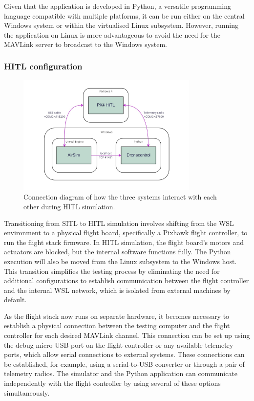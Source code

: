 Given that the application is developed in Python, a versatile programming language compatible with multiple platforms, it can be run either on the central Windows system or within the virtualised Linux subsystem. However, running the application on Linux is more advantageous to avoid the need for the MAVLink server to broadcast to the Windows system.



\subsubsection{HITL configuration}

\begin{figure}
  \centering
  \includegraphics[width=0.8\textwidth,keepaspectratio]{img/hitl-connections.jpg}
  \caption{Connection diagram of how the three systems interact with each other during HITL simulation.}\label{fig:hitl-connections}
\end{figure}

Transitioning from SITL to HITL simulation involves shifting from the WSL environment to a physical flight board, specifically a Pixhawk flight controller, to run the flight stack firmware. In HITL simulation, the flight board's motors and actuators are blocked, but the internal software functions fully. The Python execution will also be moved from the Linux subsystem to the Windows host. This transition simplifies the testing process by eliminating the need for additional configurations to establish communication between the flight controller and the internal WSL network, which is isolated from external machines by default.

As the flight stack now runs on separate hardware, it becomes necessary to establish a physical connection between the testing computer and the flight controller for each desired MAVLink channel. This connection can be set up using the debug micro-USB port on the flight controller or any available telemetry ports, which allow serial connections to external systems. These connections can be established, for example, using a serial-to-USB converter or through a pair of telemetry radios. The simulator and the Python application can communicate independently with the flight controller by using several of these options simultaneously.

